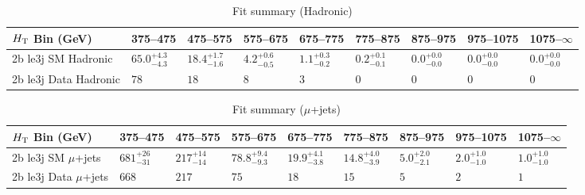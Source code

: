 \documentclass[8pt]{article}
\def\scalht{\mbox{$H_{\rm{T}}$}\xspace}
\newcommand\T{\rule{0pt}{2.6ex}}
\begin{document}
\begin{table}[ht!]
\caption{Fit summary (Hadronic)}
\label{tab:ensemble-summary}
\centering
\begin{tabular}{ lllllllll }

\hline
\scalht Bin (GeV)       & 375--475                       & 475--575                       & 575--675                       & 675--775                       & 775--875                       & 875--975                       & 975--1075                      & 1075--$\infty$                 \\ [1.000000ex]
\hline
2b le3j SM Hadronic\T   & $65.0^{+4.3}_{-4.3}$           & $18.4^{+1.7}_{-1.6}$           & $4.2^{+0.6}_{-0.5}$            & $1.1^{+0.3}_{-0.2}$            & $0.2^{+0.1}_{-0.1}$            & $0.0^{+0.0}_{-0.0}$            & $0.0^{+0.0}_{-0.0}$            & $0.0^{+0.0}_{-0.0}$            \\ 
2b le3j Data Hadronic\T & $78$                           & $18$                           & $8$                            & $3$                            & $0$                            & $0$                            & $0$                            & $0$                            \\ 
\hline

\end{tabular}
\end{table}
\begin{table}[ht!]
\caption{Fit summary ($\mu$+jets)}
\label{tab:ensemble-summary}
\centering
\begin{tabular}{ lllllllll }

\hline
\scalht Bin (GeV)       & 375--475                       & 475--575                       & 575--675                       & 675--775                       & 775--875                       & 875--975                       & 975--1075                      & 1075--$\infty$                 \\ [1.000000ex]
\hline
2b le3j SM $\mu$+jets\T & $681^{+26}_{-31}$              & $217^{+14}_{-14}$              & $78.8^{+9.4}_{-9.3}$           & $19.9^{+4.1}_{-3.8}$           & $14.8^{+4.0}_{-3.9}$           & $5.0^{+2.0}_{-2.1}$            & $2.0^{+1.0}_{-1.0}$            & $1.0^{+1.0}_{-1.0}$            \\ 
2b le3j Data $\mu$+jets\T & $668$                          & $217$                          & $75$                           & $18$                           & $15$                           & $5$                            & $2$                            & $1$                            \\ 
\hline

\end{tabular}
\end{table}
\end{document}
